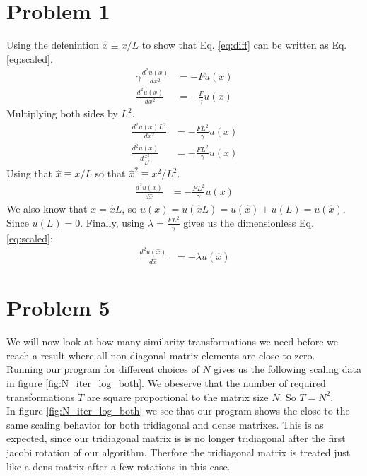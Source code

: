 \documentclass[english,notitlepage]{revtex4-1}  %
\begin{document}
\section*{Problem 1}
Using the defenintion $\hat{x} \equiv x / L$ to show that Eq. \ref*{eq:diff} can be written as Eq. \ref*{eq:scaled}.
\begin{align*}
    \gamma \frac{d^2u(x)}{dx^2} &= - F u(x) \\
    \frac{d^2u(x)}{dx^2} &= - \frac{F}{\gamma} u(x)
\end{align*}
Multiplying both sides by $L^2$.
\begin{align*}
    \frac{d^2u(x)L^2}{dx^2} &= - \frac{FL^2}{\gamma} u(x) \\
    \frac{d^2u(x)}{d\frac{x^2}{L^2}} &= - \frac{FL^2}{\gamma} u(x)
\end{align*}
Using that $\hat{x} \equiv x / L$ so that $\hat{x}^2 \equiv x^2 / L^2$.
\begin{align*}
    \frac{d^2u(x)}{d\hat{x}} &= - \frac{FL^2}{\gamma} u(x)
\end{align*}
We also know that $x = \hat{x}L$, so $u(x) = u(\hat{x}L) = u(\hat{x}) + u(L) = u(\hat{x})$. Since $u(L) = 0$. Finally, using $\lambda = \frac{FL^2}{\gamma}$ gives us the dimensionless Eq. \ref*{eq:scaled}:
\begin{align*}
    \frac{d^2u(\hat{x})}{d\hat{x}} &= - \lambda u(\hat{x})
\end{align*}

\section*{Problem 5}
We will now look at how many similarity transformations we need 
before we reach a result where all non-diagonal matrix elements 
are close to zero. \\

Running our program for different choices of $N$
gives us the following scaling data in figure \ref{fig:N_iter_log_both}.
We obeserve that the number of required transformations $T$ are 
square proportional to the matrix size $N$. So $T = N^2$. \\

In figure \ref{fig:N_iter_log_both} we see that our program shows the close to
the same scaling behavior for both tridiagonal and dense matrixes. 
This is as expected, since our tridiagonal matrix is is 
no longer tridiagonal after the first jacobi rotation of our algorithm. 
Therfore the tridiagonal matrix is treated just like a dens matrix after a few
rotations in this case.
\end{document}

